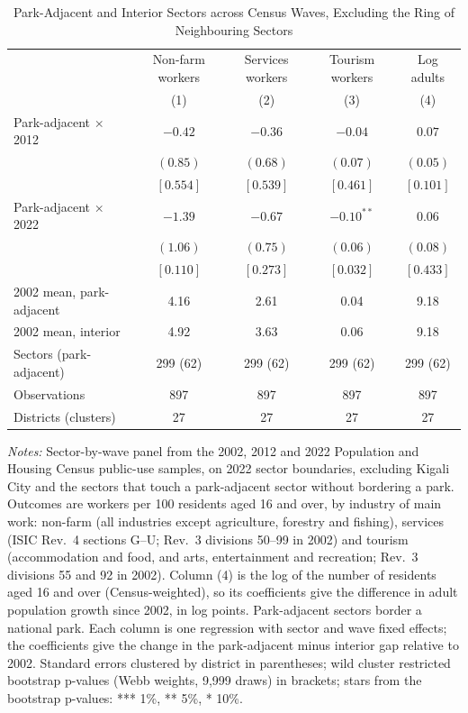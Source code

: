 \documentclass[11pt]{article}
\begin{document}
\begin{table}[H]
\centering
\caption{Park-Adjacent and Interior Sectors across Census Waves, Excluding the Ring of Neighbouring Sectors}
\label{tab:census_park_gap-no-ring}
\begin{tabular}{lcccc}
\toprule
 & Non-farm workers & Services workers & Tourism workers & Log adults \\
 & (1) & (2) & (3) & (4) \\
\midrule
Park-adjacent $\times$ 2012 & $-0.42$ & $-0.36$ & $-0.04$ & $0.07$ \\
 & $(0.85)$ & $(0.68)$ & $(0.07)$ & $(0.05)$ \\
 & $[0.554]$ & $[0.539]$ & $[0.461]$ & $[0.101]$ \\
Park-adjacent $\times$ 2022 & $-1.39$ & $-0.67$ & $-0.10^{**}$ & $0.06$ \\
 & $(1.06)$ & $(0.75)$ & $(0.06)$ & $(0.08)$ \\
 & $[0.110]$ & $[0.273]$ & $[0.032]$ & $[0.433]$ \\
\midrule
2002 mean, park-adjacent & 4.16 & 2.61 & 0.04 & 9.18 \\
2002 mean, interior & 4.92 & 3.63 & 0.06 & 9.18 \\
Sectors (park-adjacent) & 299 (62) & 299 (62) & 299 (62) & 299 (62) \\
Observations & 897 & 897 & 897 & 897 \\
Districts (clusters) & 27 & 27 & 27 & 27 \\
\bottomrule
\end{tabular}
\begin{minipage}{0.95\textwidth}\footnotesize
\textit{Notes:} Sector-by-wave panel from the 2002, 2012 and 2022 Population and Housing Census public-use samples, on 2022 sector boundaries, excluding Kigali City and the sectors that touch a park-adjacent sector without bordering a park. Outcomes are workers per 100 residents aged 16 and over, by industry of main work: non-farm (all industries except agriculture, forestry and fishing), services (ISIC Rev.~4 sections G--U; Rev.~3 divisions 50--99 in 2002) and tourism (accommodation and food, and arts, entertainment and recreation; Rev.~3 divisions 55 and 92 in 2002). Column (4) is the log of the number of residents aged 16 and over (Census-weighted), so its coefficients give the difference in adult population growth since 2002, in log points. Park-adjacent sectors border a national park. Each column is one regression with sector and wave fixed effects; the coefficients give the change in the park-adjacent minus interior gap relative to 2002. Standard errors clustered by district in parentheses; wild cluster restricted bootstrap p-values (Webb weights, 9,999 draws) in brackets; stars from the bootstrap p-values: *** 1\%, ** 5\%, * 10\%.
\end{minipage}
\end{table}
\end{document}
